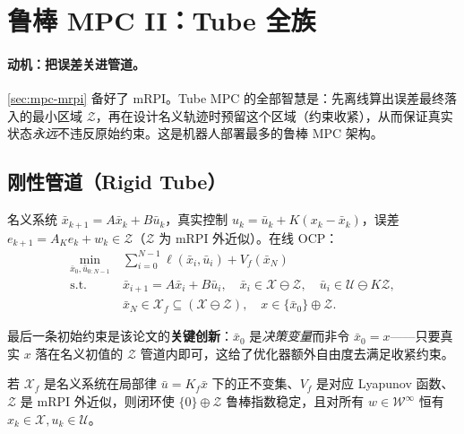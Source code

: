 \section{鲁棒 MPC II：Tube 全族}
\label{sec:mpc-tube}

\paragraph{动机：把误差关进管道。}
\cref{sec:mpc-mrpi} 备好了 mRPI。Tube MPC 的全部智慧是：先离线算出误差最终落入的最小区域 $\mathcal Z$，再在设计名义轨迹时预留这个区域（约束收紧），从而保证真实状态\emph{永远}不违反原始约束。这是机器人部署最多的鲁棒 MPC 架构。

\subsection{刚性管道（Rigid Tube）}
\label{sec:mpc-rigid-tube}
\begin{definition}
\label{def:mpc-rigid-tube}
名义系统 $\bar x_{k+1}=A\bar x_k+B\bar u_k$，真实控制 $u_k=\bar u_k+K(x_k-\bar x_k)$，误差 $e_{k+1}=A_Ke_k+w_k\in\mathcal Z$（$\mathcal Z$ 为 mRPI 外近似）。在线 OCP：
\begin{equation}
\begin{aligned}
  \min_{\bar x_0,\bar u_{0:N-1}}\ &\sum_{i=0}^{N-1}\ell(\bar x_i,\bar u_i)+V_f(\bar x_N)\\
  \mathrm{s.t.}\ &\bar x_{i+1}=A\bar x_i+B\bar u_i,\quad \bar x_i\in\mathcal X\ominus\mathcal Z,\quad \bar u_i\in\mathcal U\ominus K\mathcal Z,\\
  &\bar x_N\in\mathcal X_f\subseteq(\mathcal X\ominus\mathcal Z),\quad \boxed{x\in\{\bar x_0\}\oplus\mathcal Z}.
\end{aligned}
  \label{eq:mpc-rigid-tube-ocp}
\end{equation}
\end{definition}
最后一条初始约束是该论文的\textbf{关键创新}：$\bar x_0$ 是\emph{决策变量}而非令 $\bar x_0=x$——只要真实 $x$ 落在名义初值的 $\mathcal Z$ 管道内即可，这给了优化器额外自由度去满足收紧约束。

\begin{theorem}
\label{thm:mpc-rigid-tube}
若 $\mathcal X_f$ 是名义系统在局部律 $\bar u=K_f\bar x$ 下的正不变集、$V_f$ 是对应 Lyapunov 函数、$\mathcal Z$ 是 mRPI 外近似，则闭环使 $\{0\}\oplus\mathcal Z$ 鲁棒指数稳定，且对所有 $w\in\mathcal W^\infty$ 恒有 $x_k\in\mathcal X,u_k\in\mathcal U$。
\end{theorem}


